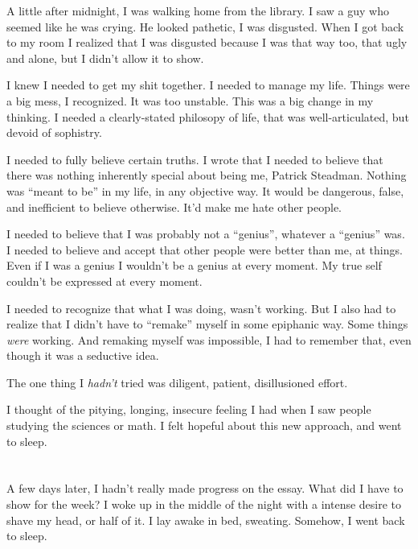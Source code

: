 A little after midnight, I was walking home from the library.  I saw a guy who
seemed like he was crying.  He looked pathetic, I was disgusted.  When I got
back to my room I realized that I was disgusted because I was that way too, that
ugly and alone, but I didn't allow it to show. 

I knew I needed to get my shit together.  I needed to manage my life.  Things
were a big mess, I recognized.  It was too unstable.  This was a big change in
my thinking.  I needed a clearly-stated philosopy of life, that was
well-articulated, but devoid of sophistry.

I needed to fully believe certain truths.  I wrote that I needed to believe that
there was nothing inherently special about being me, Patrick Steadman.  Nothing
was ``meant to be'' in my life, in any objective way.  It would be dangerous,
false, and inefficient to believe otherwise.  It'd make me hate other people.

I needed to believe that I was probably not a ``genius'', whatever a ``genius''
was.  I needed to believe and accept that other people were better than me, at
things.  Even if I was a genius I wouldn't be a genius at every moment.  My true
self couldn't be expressed at every moment.  

I needed to recognize that what I was doing, wasn't working.  But I also had to
realize that I didn't have to ``remake'' myself in some epiphanic way.  Some
things \textit{were} working.  And remaking myself was impossible, I had to
remember that, even though it was a seductive idea. 

The one thing I \textit{hadn't} tried was diligent, patient, disillusioned
effort.

I thought of the pitying, longing, insecure feeling I had when I saw people
studying the sciences or math.  I felt hopeful about this new approach, and went
to sleep. 

\section{} 


\section{}

A few days later, I hadn't really made progress on the essay.  What did I have
to show for the week? I woke up in the middle of the night with a intense desire
to shave my head, or half of it.  I lay awake in bed, sweating.  Somehow, I went
back to sleep.

